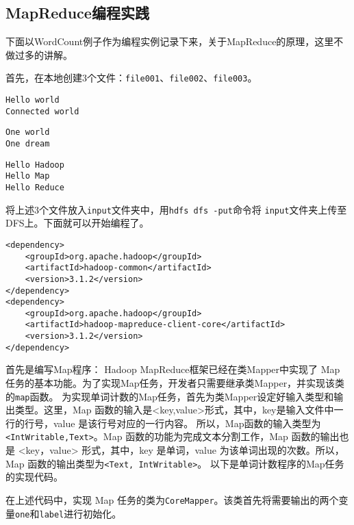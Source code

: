 \subsection{MapReduce编程实践}

下面以WordCount例子作为编程实例记录下来，关于MapReduce的原理，这里不做过多的讲解。

首先，在本地创建3个文件：\lstinline{file001}、\lstinline{file002}、\lstinline{file003}。

\begin{lstlisting}[style=mysh,title=file001]
Hello world
Connected world
\end{lstlisting}

\begin{lstlisting}[style=mysh,title=file002]
One world 
One dream
\end{lstlisting}

\begin{lstlisting}[style=mysh,title=file001]
Hello Hadoop 
Hello Map 
Hello Reduce
\end{lstlisting}

将上述3个文件放入\lstinline{input}文件夹中，用\lstinline{hdfs dfs -put}命令将
\lstinline{input}文件夹上传至DFS上。下面就可以开始编程了。

\begin{lstlisting}[style=myxml,title=POM依赖]
<dependency>
	<groupId>org.apache.hadoop</groupId>
	<artifactId>hadoop-common</artifactId>
	<version>3.1.2</version>
</dependency>
<dependency>
	<groupId>org.apache.hadoop</groupId>
	<artifactId>hadoop-mapreduce-client-core</artifactId>
	<version>3.1.2</version>
</dependency>
\end{lstlisting}

首先是编写Map程序：
Hadoop MapReduce框架已经在类Mapper中实现了 Map 任务的基本功能。为了实现Map任务，开发者只需要继承类Mapper，并实现该类的\lstinline{map}函数。
为实现单词计数的Map任务，首先为类Mapper设定好输入类型和输出类型。这里，Map 函数的输入是<key,value>形式，其中，key是输入文件中一行的行号，value 是该行号对应的一行内容。
所以，Map函数的输入类型为\lstinline{<IntWritable,Text>}。Map 函数的功能为完成文本分割工作，Map 函数的输出也是 <key，value> 形式，其中，key 是单词，value 为该单词出现的次数。所以，Map 函数的输出类型为\lstinline{<Text, IntWritable>}。
以下是单词计数程序的Map任务的实现代码。



在上述代码中，实现 Map 任务的类为\lstinline{CoreMapper}。该类首先将需要输出的两个变量\lstinline{one}和\lstinline{label}进行初始化。

